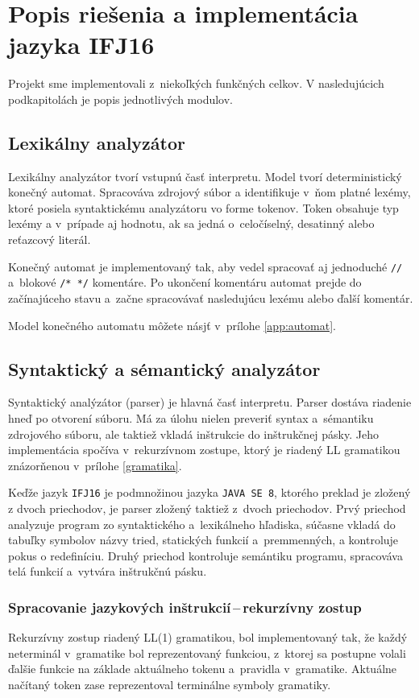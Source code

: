 \documentclass[11pt,a4paper]{article}
\begin{document}
	\section{Popis riešenia a implementácia jazyka IFJ16}
	\label{popis}

	Projekt sme implementovali z~niekoľkých funkčných celkov. V nasledujúcich podkapitolách je popis jednotlivých modulov.

	\subsection{Lexikálny analyzátor}
	\label{lexer}
	Lexikálny analyzátor tvorí vstupnú časť interpretu. Model tvorí deterministický
	konečný automat. Spracováva zdrojový súbor a identifikuje v~ňom platné lexémy,
	ktoré posiela syntaktickému analyzátoru vo forme tokenov. Token obsahuje typ lexémy
	a v~prípade aj hodnotu, ak sa jedná o~celočíselný, desatinný alebo reťazcový literál.

	Konečný automat je implementovaný tak, aby vedel spracovať aj jednoduché \texttt{//}
	a~blokové \texttt{/* */} komentáre. Po ukončení komentáru  automat prejde do
	začínajúceho stavu a~začne spracovávať nasledujúcu lexému alebo ďalší komentár.

	Model konečného automatu môžete násjť v~prílohe \ref{app:automat}.


	\subsection{Syntaktický a sémantický analyzátor}
	\label{parser}
	Syntaktický analýzátor (parser) je hlavná časť interpretu. Parser dostáva
	riadenie hneď po otvorení súboru. Má za úlohu nielen preveriť syntax
	a~sémantiku zdrojového súboru, ale taktiež vkladá inštrukcie do inštrukčnej
	pásky. Jeho implementácia spočíva v~rekurzívnom zostupe, ktorý je riadený
	LL gramatikou znázorňenou v~prílohe \ref{gramatika}.

	Keďže jazyk \texttt{IFJ16} je podmnožinou jazyka \texttt{JAVA SE 8},
	ktorého preklad je zložený z dvoch priechodov, je parser zložený
	taktiež z~dvoch priechodov. Prvý priechod analyzuje program zo syntaktického
	a~lexikálneho hľadiska, súčasne vkladá do tabuľky symbolov názvy tried,
	statických funkcií a~premmenných, a kontroluje pokus o redefiníciu.
    Druhý priechod kontroluje semántiku
	programu, spracováva telá funkcií a~vytvára inštrukčnú pásku.



	\subsubsection{Spracovanie jazykových inštrukcií\,--\,rekurzívny zostup}
	\label{rekurzia}
	Rekurzívny zostup riadený LL(1) gramatikou, bol implementovaný tak, že každý
	neterminál v~gramatike bol reprezentovaný funkciou, z~ktorej sa postupne
	volali ďalšie funkcie na základe aktuálneho tokenu a~pravidla v~gramatike.
	Aktuálne načítaný token zase reprezentoval terminálne symboly gramatiky.
\end{document}
